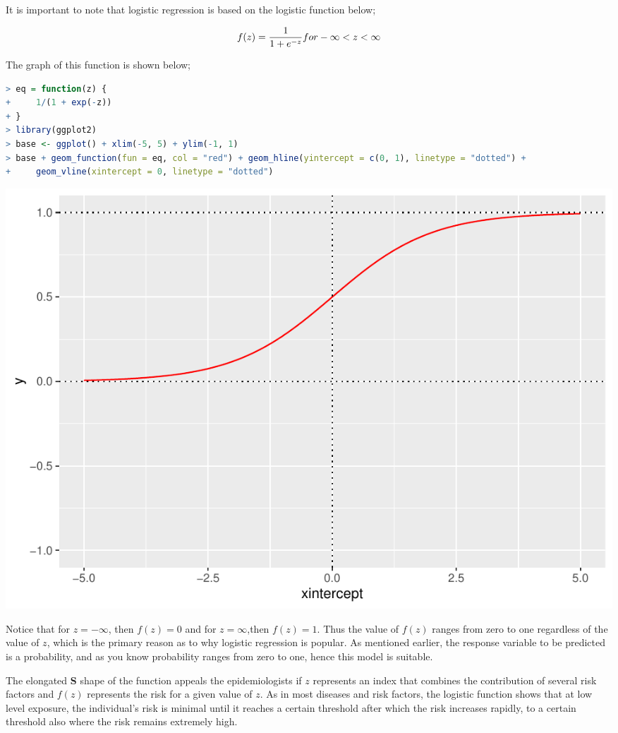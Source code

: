 \documentclass[
]{article}
\begin{document}
It is important to note that logistic regression is based on the
logistic function below;

\[f(z)=\frac{1}{1+e^{-z}}\space\space for\space\space -\infty<z<\infty \]

The graph of this function is shown below;

\begin{lstlisting}[language=R]
> eq = function(z) {
+     1/(1 + exp(-z))
+ }
> library(ggplot2)
> base <- ggplot() + xlim(-5, 5) + ylim(-1, 1)
> base + geom_function(fun = eq, col = "red") + geom_hline(yintercept = c(0, 1), linetype = "dotted") +
+     geom_vline(xintercept = 0, linetype = "dotted")
\end{lstlisting}

\includegraphics{Logistic-regression_files/figure-latex/unnamed-chunk-1-1.pdf}

Notice that for \(z=-\infty\), then \(f(z)=0\) and for \(z=\infty\),then
\(f(z)=1\). Thus the value of \(f(z)\) ranges from zero to one
regardless of the value of \(z\), which is the primary reason as to why
logistic regression is popular. As mentioned earlier, the response
variable to be predicted is a probability, and as you know probability
ranges from zero to one, hence this model is suitable.

The elongated \textbf{S} shape of the function appeals the
epidemiologists if \(z\) represents an index that combines the
contribution of several risk factors and \(f(z)\) represents the risk
for a given value of \(z\). As in most diseases and risk factors, the
logistic function shows that at low level exposure, the individual's
risk is minimal until it reaches a certain threshold after which the
risk increases rapidly, to a certain threshold also where the risk
remains extremely high.
\end{document}
